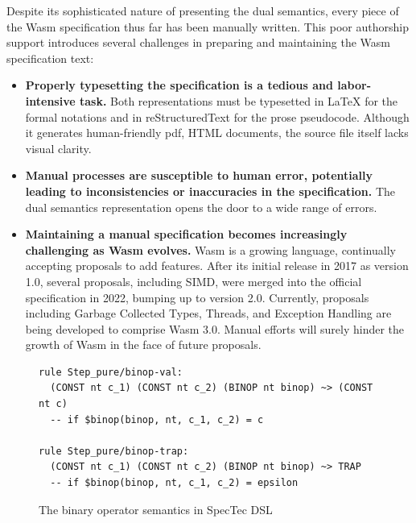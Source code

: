 Despite its sophisticated nature of presenting the dual semantics, every piece of the Wasm specification thus far has been manually written. This poor authorship support introduces several challenges in preparing and maintaining the Wasm specification text:
\begin{itemize}
\item \textbf{Properly typesetting the specification is a tedious and labor-intensive task.}
 Both representations must be typesetted in LaTeX for the formal notations and in reStructuredText for the prose pseudocode. Although it generates human-friendly pdf, HTML documents, the source file itself lacks visual clarity.
\item \textbf{Manual processes are susceptible to human error, potentially leading to inconsistencies or inaccuracies in the specification.}
The dual semantics representation opens the door to a wide range of errors.
\item \textbf{Maintaining a manual specification becomes increasingly challenging as Wasm evolves.} Wasm is a growing language, continually accepting proposals to add features. After its initial release in 2017 as version 1.0, several proposals, including SIMD, were merged into the official specification in 2022, bumping up to version 2.0. Currently, proposals including Garbage Collected Types, Threads, and Exception Handling are being developed to comprise Wasm 3.0. Manual efforts will surely hinder the growth of Wasm in the face of future proposals.
\end{itemize}

\begin{figure}[t]
\footnotesize
\begin{verbatim}
rule Step_pure/binop-val:
  (CONST nt c_1) (CONST nt c_2) (BINOP nt binop) ~> (CONST nt c)
  -- if $binop(binop, nt, c_1, c_2) = c

rule Step_pure/binop-trap:
  (CONST nt c_1) (CONST nt c_2) (BINOP nt binop) ~> TRAP
  -- if $binop(binop, nt, c_1, c_2) = epsilon
\end{verbatim}
\caption{The binary operator semantics in SpecTec DSL}
\label{fig:dsl}
\end{figure}

